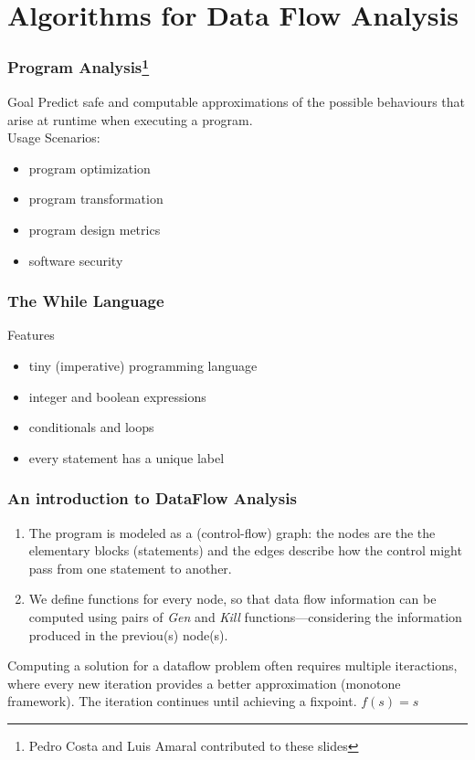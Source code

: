 \section{Algorithms for Data Flow Analysis}


\begin{frame}
  \frametitle{Program Analysis\footnote{Pedro Costa and Luis Amaral contributed to these slides}}

  \begin{block}{Goal}
    Predict {\color{blue}safe} and {\color{blue}computable approximations} of the possible
    behaviours that arise at runtime when executing a program. \pause \\
    Usage Scenarios:
    \begin{itemize}
     \item program optimization
     \item program transformation
     \item program design metrics
     \item software security
    \end{itemize}
  \end{block}
\end{frame}

\begin{frame}
  \frametitle{The While Language}

  \begin{block}{Features}
    \begin{itemize}
     \item tiny (imperative) programming language
     \item integer and boolean expressions  
     \item conditionals and loops \pause
     \item every statement has a unique label  
    \end{itemize}
  \end{block}

\end{frame}

\begin{frame}
  \frametitle{An introduction to DataFlow Analysis}

  \begin{enumerate}
    \item The program is modeled as a (control-flow) graph: the nodes are the
  the elementary blocks (statements) and the edges describe how the
  control might pass from one statement to another.

    \item We define functions for every node, so that data flow information
      can be computed using pairs of \emph{Gen} and \emph{Kill} functions---considering the
      information produced in the previou(s) node(s). 
  \end{enumerate}

  \pause Computing a solution for a dataflow problem often
  requires multiple iteractions, where every new iteration
  provides a better approximation (monotone framework).
  The iteration continues until achieving a {\color{blue}fixpoint}.
  \pause $f(s) = s$
  
\end{frame}

